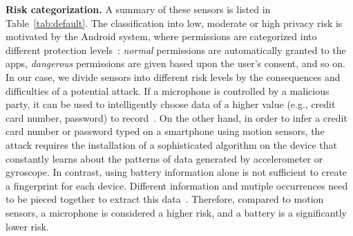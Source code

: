\textbf{Risk categorization.}
A summary of these sensors is listed in Table~\ref{tab:default}.
The classification into low, moderate or high 
privacy risk is motivated by the Android system, where 
permissions are categorized into different protection levels~\cite{level}:
\textit{normal} permissions are automatically granted to the apps, 
\textit{dangerous} permissions are given based upon the 
user's consent, and so on. In our case, 
we divide sensors into different risk levels by the consequences and 
difficulties of a potential attack. If a microphone is controlled by 
a malicious party, it can be used to intelligently choose data of a 
higher value (e.g., credit card number, password) to record~\cite{zhang2015leave}. On the other 
hand, in order to infer a credit card number or password typed on a 
smartphone using motion sensors, the attack requires the installation of 
a sophisticated algorithm on the device that constantly learns about  
the patterns of data generated by accelerometer or gyroscope. In contrast,
using battery information alone is not sufficient to create a fingerprint 
for each device. Different information and mutiple occurrences need to
be pieced together to extract this data~\cite{battery-priv}. Therefore, 
compared to motion sensors, a microphone is considered a higher risk, 
and a battery is a significantly lower risk.

